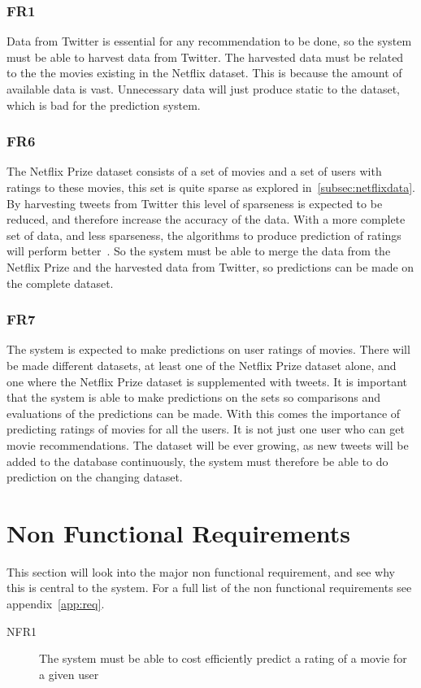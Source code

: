 \subsubsection{FR1}
Data from Twitter is essential for any recommendation to be done, so the system must be able to harvest data from Twitter. The harvested data must be related to the the movies existing in the Netflix dataset. This is because the amount of available data is vast. Unnecessary data will just produce static to the dataset, which is bad for the prediction system.

\subsubsection{FR6}
The Netflix Prize dataset consists of a set of movies and a set of users with ratings to these movies, this set is quite sparse as explored in~\ref{subsec:netflixdata}. By harvesting tweets from Twitter this level of sparseness is expected to be reduced, and therefore increase the accuracy of the data. With a more complete set of data, and less sparseness, the algorithms to produce prediction of ratings will perform better~\cite{grobelnikDataSparsityIssues}. So the system must be able to merge the data from the Netflix Prize and the harvested data from Twitter, so predictions can be made on the complete dataset.

\subsubsection{FR7}
The system is expected to make predictions on user ratings of movies. There will be made different datasets, at least one of the Netflix Prize dataset alone, and one where the Netflix Prize dataset is supplemented with tweets. It is important that the system is able to make predictions on the sets so comparisons and evaluations of the predictions can be made.
With this comes the importance of predicting ratings of movies for all the users. It is not just one user who can get movie recommendations. The dataset will be ever growing, as new tweets will be added to the database continuously, the system must therefore be able to do prediction on the changing dataset.

\section{Non Functional Requirements}\label{section:non-functional-requirements}
This section will look into the major non functional requirement, and see why this is central to the system. For a full list of the non functional requirements see appendix~\ref{app:req}.
\begin{description}
  \item[NFR1] The system must be able to cost efficiently predict a rating of a movie for a given user
\end{description}

